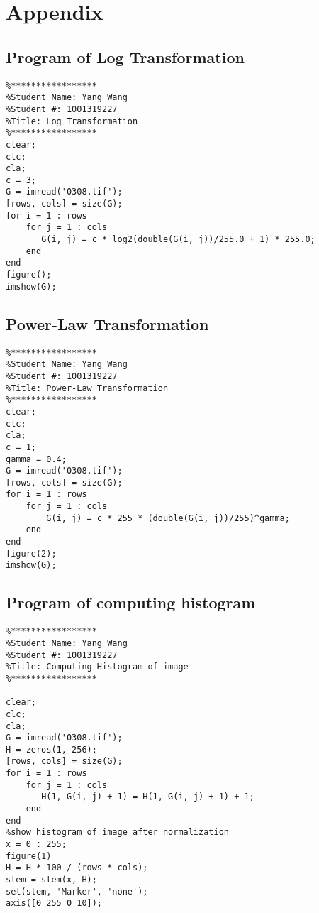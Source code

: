 \section{Appendix}
\subsection{Program of Log Transformation}
\begin{lstlisting}
%*****************
%Student Name: Yang Wang
%Student #: 1001319227
%Title: Log Transformation
%*****************
clear;
clc;
cla;
c = 3;
G = imread('0308.tif');
[rows, cols] = size(G);
for i = 1 : rows
    for j = 1 : cols
       G(i, j) = c * log2(double(G(i, j))/255.0 + 1) * 255.0;
    end
end 
figure();
imshow(G);    
\end{lstlisting}

\subsection{Power-Law Transformation}
\begin{lstlisting}
%*****************
%Student Name: Yang Wang
%Student #: 1001319227
%Title: Power-Law Transformation
%*****************
clear;
clc;
cla;
c = 1;
gamma = 0.4;
G = imread('0308.tif');
[rows, cols] = size(G);
for i = 1 : rows 
    for j = 1 : cols
        G(i, j) = c * 255 * (double(G(i, j))/255)^gamma;
    end
end
figure(2);
imshow(G);   
\end{lstlisting}

\subsection{Program of computing histogram}
\begin{lstlisting}
%*****************
%Student Name: Yang Wang
%Student #: 1001319227
%Title: Computing Histogram of image
%*****************

clear;
clc;
cla;
G = imread('0308.tif');
H = zeros(1, 256);
[rows, cols] = size(G);
for i = 1 : rows
    for j = 1 : cols
       H(1, G(i, j) + 1) = H(1, G(i, j) + 1) + 1;
    end
end
%show histogram of image after normalization
x = 0 : 255;
figure(1)
H = H * 100 / (rows * cols);
stem = stem(x, H);
set(stem, 'Marker', 'none');
axis([0 255 0 10]);
\end{lstlisting}

